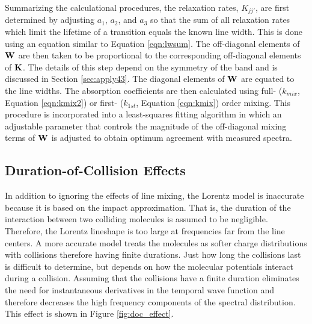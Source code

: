 \documentclass[11pt]{article}
\begin{document}
Summarizing the calculational procedures, the relaxation rates, $K_{jj'}$, 
are first determined by adjusting $a_{1}$, $a_{2}$,
and $a_{3}$ so that the sum of all relaxation rates which limit the
lifetime of a transition equals the known line width.  This is done using
an equation similar to Equation \ref{eqn:lwsum}.  The off-diagonal elements
of ${\bf W}$ are then taken to be proportional to the corresponding
off-diagonal elements of ${\bf K}$.  The details of this step depend on
the symmetry of the band and is discussed in Section \ref{sec:apply43}.
The diagonal elements of ${\bf W}$ are equated to the line widths.
The absorption coefficients are then calculated using 
full- ($k_{mix}$, Equation \ref{eqn:kmix2}) or first- ($k_{1st}$, Equation
\ref{eqn:kmix}) order mixing.  This procedure is incorporated into a
least-squares fitting algorithm in which an adjustable parameter
that controls the magnitude of the off-diagonal mixing terms of ${\bf W}$ is
adjusted to obtain optimum agreement with measured spectra.  

\subsection{Duration-of-Collision Effects}\label{sec:doceffect}
In addition to ignoring the effects of line mixing, the Lorentz model is
inaccurate because it is based on the impact approximation.  That is, the
duration of the interaction between two colliding molecules is assumed to
be negligible.  Therefore, the Lorentz lineshape is too large at
frequencies far from the line centers.  A more accurate 
model treats the molecules as softer charge distributions with 
collisions therefore having finite durations.  Just how long the 
collisions last is difficult to determine, but depends on how
the molecular potentials interact during a collision.  Assuming that 
the collisions have a finite duration eliminates the need for 
instantaneous derivatives in the temporal wave function and therefore 
decreases the high frequency components of the spectral distribution.
This effect is shown in Figure \ref{fig:doc_effect}.
\end{document}

